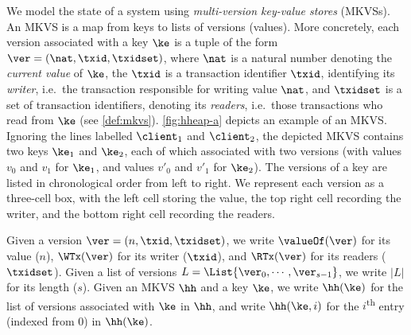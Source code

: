  We model the state of a system using \emph{multi-version key-value stores} (MKVSs). An MKVS is a map from keys to lists of versions (values).
More concretely, each version associated with a key $\ke$ is a tuple of the form \( \ver =( \nat, \txid, \txidset ) \), where  $\nat$ is a natural number denoting the \emph{current value} of $\ke$, 
the $\txid$ is a transaction identifier \( \txid \), identifying its \emph{writer}, i.e.\ the transaction responsible for writing value $\nat$, and 
$\txidset$ is a set of transaction identifiers, denoting its \emph{readers}, i.e.\ those transactions who read from $\ke$ (see \cref{def:mkvs}).
\cref{fig:hheap-a} depicts an example of an MKVS. 
Ignoring the lines labelled $\client_1$ and $\client_2$, the depicted MKVS contains two keys \( \ke_1\) and \( \ke_2 \), each of which associated with two versions (with values $v_0$ and $v_1$ for $\ke_1$, and values $v'_0$ and $v'_1$ for $\ke_2$).
The versions of a key are listed in chronological order from left to right.
We represent each version as a three-cell box, with the left cell storing the value, the top right cell recording the writer, and the bottom right cell recording the readers. 


Given a version $\ver = (n, \txid, \txidset)$, we write $\valueOf(\ver)$ for its value ($n$), $\WTx(\ver)$ for its writer ($\txid$), and $\RTx(\ver)$ for its readers ($\txidset$). 
Given a list of versions $L = \List{\ver_0, \cdots, \ver_{s-1}}$, we write  $\lvert L\rvert$ for its length ($s$). 
Given an MKVS $\hh$ and a key $\ke$, we write $\hh(\ke)$ for the list of versions associated with $\ke$ in $\hh$, and write \(\hh(\ke,i) \) for the $i$\textsuperscript{th} entry (indexed from $0$) in $\hh(\ke)$. 


